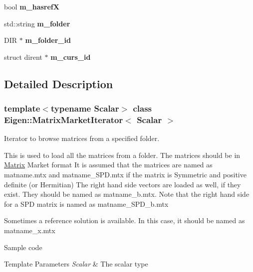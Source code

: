 \begin{DoxyCompactItemize}
bool {\bfseries m\+\_\+hasrefX}
\item 
\mbox{\label{class_eigen_1_1_matrix_market_iterator_aff90c96d8d1d317f1bdd53be80be523a}} 
std\+::string {\bfseries m\+\_\+folder}
\item 
\mbox{\label{class_eigen_1_1_matrix_market_iterator_afbe52a7c41e8386dee293409f02db07b}} 
D\+IR $\ast$ {\bfseries m\+\_\+folder\+\_\+id}
\item 
\mbox{\label{class_eigen_1_1_matrix_market_iterator_a511a318b96e7168307ec3df5d4564d99}} 
struct dirent $\ast$ {\bfseries m\+\_\+curs\+\_\+id}
\end{DoxyCompactItemize}


\subsection{Detailed Description}
\subsubsection*{template$<$typename Scalar$>$\newline
class Eigen\+::\+Matrix\+Market\+Iterator$<$ Scalar $>$}

Iterator to browse matrices from a specified folder. 

This is used to load all the matrices from a folder. The matrices should be in \hyperlink{group___core___module_class_eigen_1_1_matrix}{Matrix} Market format It is assumed that the matrices are named as matname.\+mtx and matname\+\_\+\+S\+P\+D.\+mtx if the matrix is Symmetric and positive definite (or Hermitian) The right hand side vectors are loaded as well, if they exist. They should be named as matname\+\_\+b.\+mtx. Note that the right hand side for a S\+PD matrix is named as matname\+\_\+\+S\+P\+D\+\_\+b.\+mtx

Sometimes a reference solution is available. In this case, it should be named as matname\+\_\+x.\+mtx

Sample code 
\begin{DoxyCode}
\end{DoxyCode}



\begin{DoxyTemplParams}{Template Parameters}
{\em Scalar} & The scalar type \\
\hline
\end{DoxyTemplParams}


